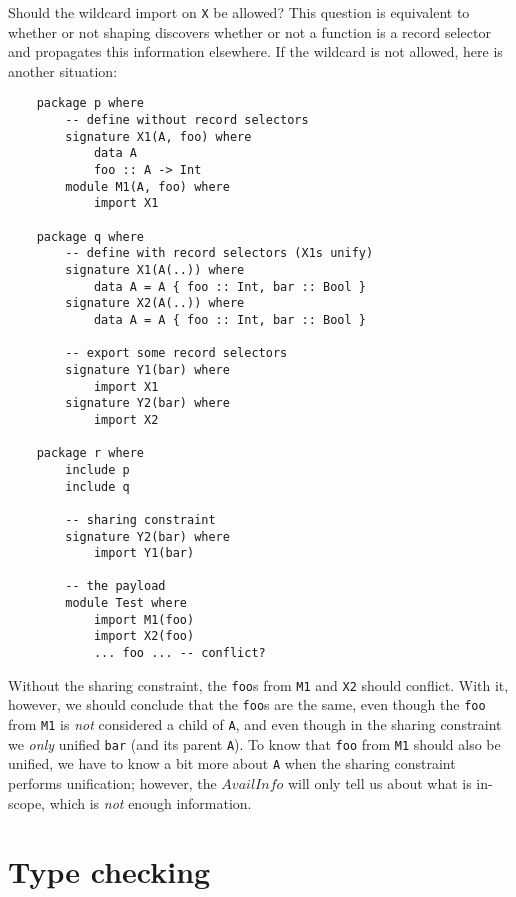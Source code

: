\documentclass{article}
\newcommand{\I}[1]{\ensuremath{\mathit{#1}}}
\begin{document}
Should the wildcard import on \verb|X| be allowed?
This question is equivalent to whether or not shaping discovers
whether or not a function is a record selector and propagates this
information elsewhere.
If the wildcard is not allowed, here is another situation:

\begin{verbatim}
    package p where
        -- define without record selectors
        signature X1(A, foo) where
            data A
            foo :: A -> Int
        module M1(A, foo) where
            import X1

    package q where
        -- define with record selectors (X1s unify)
        signature X1(A(..)) where
            data A = A { foo :: Int, bar :: Bool }
        signature X2(A(..)) where
            data A = A { foo :: Int, bar :: Bool }

        -- export some record selectors
        signature Y1(bar) where
            import X1
        signature Y2(bar) where
            import X2

    package r where
        include p
        include q

        -- sharing constraint
        signature Y2(bar) where
            import Y1(bar)

        -- the payload
        module Test where
            import M1(foo)
            import X2(foo)
            ... foo ... -- conflict?
\end{verbatim}

Without the sharing constraint, the \verb|foo|s from \verb|M1| and \verb|X2|
should conflict.  With it, however, we should conclude that the \verb|foo|s
are the same, even though the \verb|foo| from \verb|M1| is \emph{not}
considered a child of \verb|A|, and even though in the sharing constraint
we \emph{only} unified \verb|bar| (and its parent \verb|A|).  To know that
\verb|foo| from \verb|M1| should also be unified, we have to know a bit
more about \verb|A| when the sharing constraint performs unification;
however, the \I{AvailInfo} will only tell us about what is in-scope, which
is \emph{not} enough information.


\section{Type checking}
\end{document}

